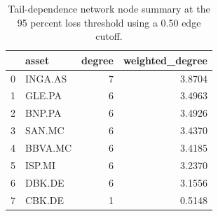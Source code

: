 \begin{table}
\caption{Tail-dependence network node summary at the 95 percent loss threshold using a 0.50 edge cutoff.}
\label{tab:tail_dependence_network_summary_q95_threshold_050}
\begin{tabular}{llrr}
\toprule
 & asset & degree & weighted_degree \\
\midrule
0 & INGA.AS & 7 & 3.8704 \\
1 & GLE.PA & 6 & 3.4963 \\
2 & BNP.PA & 6 & 3.4926 \\
3 & SAN.MC & 6 & 3.4370 \\
4 & BBVA.MC & 6 & 3.4185 \\
5 & ISP.MI & 6 & 3.2370 \\
6 & DBK.DE & 6 & 3.1556 \\
7 & CBK.DE & 1 & 0.5148 \\
\bottomrule
\end{tabular}
\end{table}
